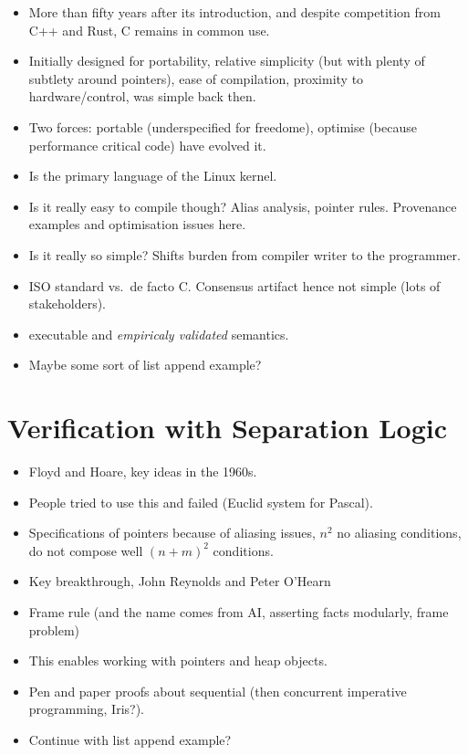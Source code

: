 \begin{itemize}
    \item More than fifty years after its introduction, and despite competition
        from C++ and Rust, C remains in common use.
    \item Initially designed for portability, relative simplicity (but with plenty of
        subtlety around pointers), ease of compilation, proximity to hardware/control, was simple back then.
    \item Two forces: portable (underspecified for freedome), optimise (because performance critical code)
            have evolved it.
    \item Is the primary language of the Linux kernel.
    \item Is it really easy to compile though? Alias analysis, pointer rules.
        Provenance examples and optimisation issues here.
    \item Is it really so simple? Shifts burden from compiler writer to the programmer.
    \item ISO standard vs.\ de facto C\@. Consensus artifact hence not simple (lots of stakeholders).
    \item {} executable and \emph{empiricaly validated} semantics.
    \item Maybe some sort of list append example?
\end{itemize}

\section{Verification with Separation Logic}

\begin{itemize}
    \item Floyd and Hoare, key ideas in the 1960s.
    \item People tried to use this and failed (Euclid system for Pascal).
    \item Specifications of pointers because of aliasing issues, $n^2$ no aliasing conditions,
        do not compose well ${(n + m)}^2$ conditions.
    \item Key breakthrough, John Reynolds and Peter O'Hearn
    \item Frame rule (and the name comes from AI, asserting facts modularly, frame problem)
    \item This enables working with pointers and heap objects.
    \item Pen and paper proofs about sequential (then concurrent imperative programming, Iris?).
    \item Continue with list append example?
\end{itemize}

